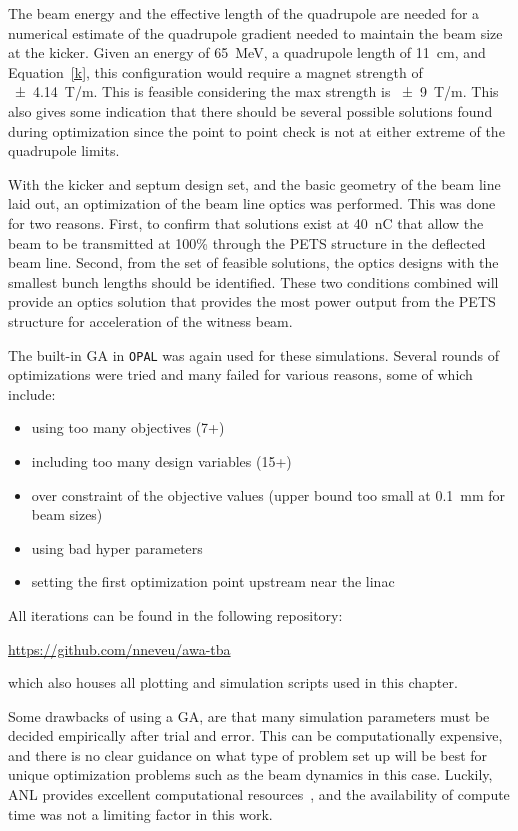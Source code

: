 The beam energy and the effective length of the quadrupole are needed for a numerical estimate of 
the quadrupole gradient needed to maintain the beam size at the kicker. 
Given an energy of \SI{65}{MeV}, a quadrupole length of \SI{11}{cm}, 
and Equation~\ref{k}, this configuration would require a 
magnet strength of \SI{\pm4.14}{T/m}. This is feasible considering the 
max strength is \SI{\pm9}{T/m}. This also gives some indication 
that there should be several possible solutions found during optimization
since the point to point check is not at either extreme of the quadrupole limits.


\label{failed}
 
With the kicker and septum design set, 
and the basic geometry of the beam line laid out, 
an optimization of the beam line optics was performed.
This was done for two reasons. First, to confirm that solutions 
exist at \SI{40}{nC} that allow the beam to be transmitted at 100\% through the PETS structure in the deflected beam line.
Second, from the set of feasible solutions, the optics designs with the smallest bunch lengths should be identified.
These two conditions combined will provide an optics solution that provides the most power output from the PETS structure for acceleration of the witness beam. 

The built-in GA in \verb|OPAL| was again used for these simulations. 
Several rounds of optimizations were tried and many failed for various reasons, 
some of which include:
\begin{itemize}
	\item using too many objectives (7+)
	\item including too many design variables (15+)
	\item over constraint of the objective values (upper bound too small at \SI{0.1}{mm} for beam sizes)
	\item using bad hyper parameters
	\item setting the first optimization point upstream near the linac
\end{itemize}
All iterations can be found in the following repository:
\begin{center}
	\url{https://github.com/nneveu/awa-tba}
\end{center}
which also houses all plotting and simulation scripts used in this chapter.

Some drawbacks of using a GA, are that many simulation parameters 
must be decided empirically after trial and error.
This can be computationally expensive, 
and there is no clear guidance on what type of problem set up will be 
best for unique optimization problems such as the beam dynamics in this case.
Luckily, ANL provides excellent computational resources~\cite{lcrc}, and
the availability of compute time was not a limiting factor in this work.

